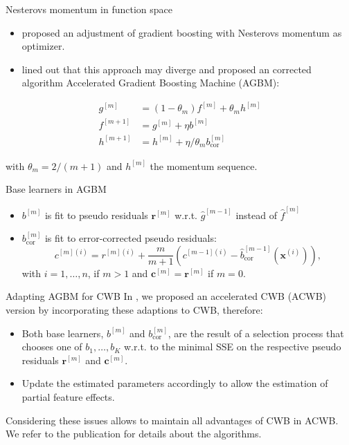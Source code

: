 \documentclass[ignorenonframetext,]{beamer}
\providecommand{\tightlist}{%
  \setlength{\itemsep}{0pt}\setlength{\parskip}{0pt}}
\newcommand{\fh}{\hat{f}}
\newcommand{\fmh}{\fh^{[m]}}
\newcommand{\xv}{\bm{x}}
\newcommand{\pr}{r}
\newcommand{\prv}{\bm{r}}
\newcommand{\rmi}{\pr^{[m](i)}}
\renewcommand{\xi}[1][i]{\xv^{(#1)}}
\newcommand{\rmm}{\prv^{[m]}}
\begin{document}
\begin{frame}{Nesterovs momentum in function space}
\protect\hypertarget{nesterovs-momentum-in-function-space}{}
\begin{itemize}
\tightlist
\item
  \citet{biau2019accelerated} proposed an adjustment of gradient
  boosting with Nesterovs momentum as optimizer.
\item
  \citet{lu2020accelerating} lined out that this approach may diverge
  and proposed an corrected algorithm Accelerated Gradient Boosting
  Machine (AGBM):
\end{itemize}

\vspace{-0.9cm}
\begin{align*}
g^{[m]} &= (1 - \theta_m) f^{[m]} + \theta_m h^{[m]}\\
f^{[m+1]} &= g^{[m]} + \eta b^{[m]} \\
h^{[m+1]} &= h^{[m]} + \eta / \theta_m b^{[m]}_{\text{cor}}
\end{align*}

with \(\theta_m = 2 / (m + 1)\) and \(h^{[m]}\) the momentum sequence.
\end{frame}

\begin{frame}{Base learners in AGBM}
\protect\hypertarget{base-learners-in-agbm}{}
\begin{itemize}
\tightlist
\item
  \(b^{[m]}\) is fit to pseudo residuals \(\rmm\) w.r.t.
  \(\hat{g}^{[m-1]}\) instead of \(\fmh\)
\item
  \(b^{[m]}_{\text{cor}}\) is fit to error-corrected pseudo residuals:
  \[c^{[m](i)} = \rmi + \frac{m}{m+1}(c^{[m-1](i)} - \hat{b}_{\text{cor}}^{[m-1]}(\xi)),\]
  with \(i = 1, \dots, n\), if \(m > 1\) and \(\bm{c}^{[m]} = \rmm\) if
  \(m = 0\).
\end{itemize}
\end{frame}

\begin{frame}{Adapting AGBM for CWB}
\protect\hypertarget{adapting-agbm-for-cwb}{}
In \citet{schalk2022accelerated}, we proposed an accelerated CWB (ACWB)
version by incorporating these adaptions to CWB, therefore:

\begin{itemize}
\tightlist
\item
  Both base learners, \(b^{[m]}\) and \(b^{[m]}_{\text{cor}}\), are the
  result of a selection process that chooses one of \(b_1, \dots, b_K\)
  w.r.t. to the minimal SSE on the respective pseudo residuals \(\rmm\)
  and \(\bm{c}^{[m]}\).
\item
  Update the estimated parameters accordingly to allow the estimation of
  partial feature effects.
\end{itemize}

Considering these issues allows to maintain all advantages of CWB in
ACWB. We refer to the publication for details about the algorithms.
\end{frame}
\end{document}
